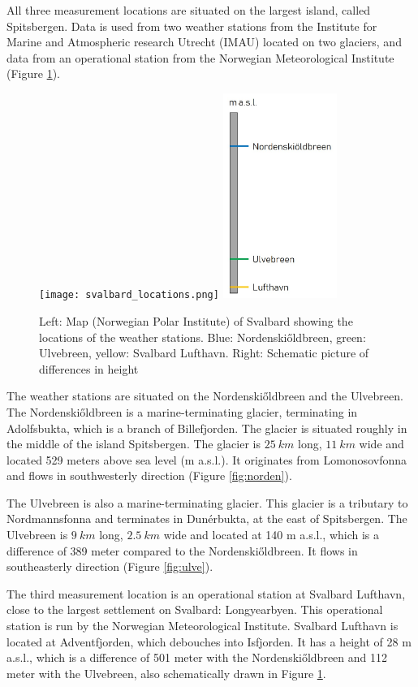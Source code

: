 \documentclass[11pt]{report}
\begin{document}
All three measurement locations are situated on the largest island, called Spitsbergen. Data is used from two weather stations from the Institute for Marine and Atmospheric research Utrecht (IMAU) located on two glaciers, and data from an operational station from the Norwegian Meteorological Institute (Figure \ref{fig:locations}).

\begin{figure}[h]
\texttt{[image: svalbard\_locations.png]}
\includegraphics[scale=1, width=0.33\textwidth]{height.jpg}
\centering{}
\caption{Left: Map (Norwegian Polar Institute) of Svalbard showing the locations of the weather stations. Blue: Nordenski\H{o}ldbreen, green: Ulvebreen, yellow: Svalbard Lufthavn. Right: Schematic picture of differences in height}
\label{fig:locations}
\end{figure}

The weather stations are situated on the Nordenski\H{o}ldbreen and the Ulvebreen. The Nordenski\H{o}ldbreen is a marine-terminating glacier, terminating in Adolfsbukta, which is a branch of Billefjorden. The glacier is situated roughly in the middle of the island Spitsbergen. The glacier is $\SI{25}{km}$ long, $\SI{11}{km}$ wide and located 529 meters above sea level (m a.s.l.). It originates from Lomonosovfonna and flows in southwesterly direction (Figure \ref{fig:norden}). 

The Ulvebreen is also a marine-terminating glacier. This glacier is a tributary to Nordmannsfonna and terminates in Dunérbukta, at the east of Spitsbergen. The Ulvebreen is $\SI{9}{km}$ long, $\SI{2.5}{km}$ wide and located at 140 m a.s.l., which is a difference of 389 meter compared to the Nordenski\H{o}ldbreen. It flows in southeasterly direction (Figure \ref{fig:ulve}). 

The third measurement location is an operational station at Svalbard Lufthavn, close to the largest settlement on Svalbard: Longyearbyen. This operational station is run by the Norwegian Meteorological Institute. Svalbard Lufthavn is located at Adventfjorden, which debouches into Isfjorden. It has a height of 28 m a.s.l., which is a difference of 501 meter with the Nordenski\H{o}ldbreen and 112 meter with the Ulvebreen, also schematically drawn in Figure \ref{fig:locations}.
\end{document}
